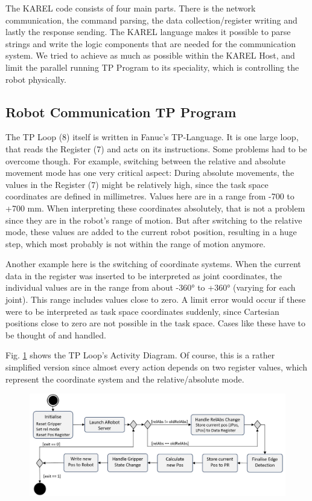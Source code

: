 The KAREL code consists of four main parts. There is the network communication, the command parsing, the data collection/register writing and lastly the response sending. The KAREL language makes it possible to parse strings and write the logic components that are needed for the communication system. We tried to achieve as much as possible within the KAREL Host, and limit the parallel running TP Program to its speciality, which is controlling the robot physically.

\subsection{Robot Communication TP Program}

The TP Loop (8) itself is written in Fanuc's TP-Language. It is one large loop, that reads the Register (7) and acts on its instructions. Some problems had to be overcome though. For example, switching between the relative and absolute movement mode has one very critical aspect: During absolute movements, the values in the Register (7) might be relatively high, since the task space coordinates are defined in millimetres. Values here are in a range from -700 to +700 mm. When interpreting these coordinates absolutely, that is not a problem since they are in the robot's range of motion. But after switching to the relative mode, these values are added to the current robot position, resulting in a huge step, which most probably is not within the range of motion anymore.

Another example here is the switching of coordinate systems. When the current data in the register was inserted to be interpreted as joint coordinates, the individual values are in the range from about -360° to +360° (varying for each joint). This range includes values close to zero. A limit error would occur if these were to be interpreted as task space coordinates suddenly, since Cartesian positions close to zero are not possible in the task space. Cases like these have to be thought of and handled. 

Fig. \ref{Fig:TPLoopFlowChart} shows the TP Loop's Activity Diagram. Of course, this is a rather simplified version since almost every action depends on two register values, which represent the coordinate system and the relative/absolute mode. 

\begin{figure}
	\centering
	\includegraphics[width=0.9\linewidth]{Figures/TPLoopFlowChart.jpg}
	\caption{}
	\label{Fig:TPLoopFlowChart}
\end{figure}

